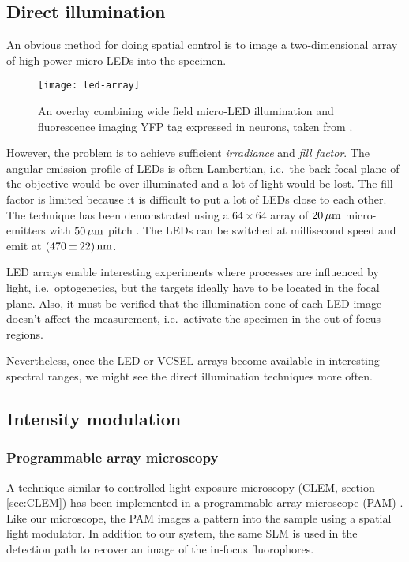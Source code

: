 \subsection{Direct illumination}
An obvious method for doing spatial control is to image a
two-dimensional array of high-power micro-LEDs into the specimen.
\begin{figure}[!hbt]
  \centering
  \texttt{[image: led-array]} 
  \caption{An overlay combining wide field micro-LED illumination and
    fluorescence imaging YFP tag expressed in neurons, taken from
    \citet{grossman2010}.}
  \label{fig:led-array}
\end{figure}
However, the problem is to achieve sufficient \emph{irradiance} and
\emph{fill factor}. The angular emission profile of LEDs is often
Lambertian, i.e.\ the back focal plane of the objective would be
over-illuminated and a lot of light would be lost. The fill factor is
limited because it is difficult to put a lot of LEDs close to each
other.  The technique has been demonstrated using a $64\times64$ array
of $\unit[20]{\mu m}$ micro-emitters with $\unit[50]{\mu m}$ pitch
\citep{grossman2010}.  The LEDs can be switched at millisecond speed
and emit at $\unit[(470\pm22)]{nm}$.


LED arrays enable interesting experiments where processes are
influenced by light, i.e.\ optogenetics, but the targets ideally have
to be located in the focal plane. Also, it must be verified that the
illumination cone of each LED image doesn't affect the measurement,
i.e.\ activate the specimen in the out-of-focus regions.

Nevertheless, once the LED or VCSEL arrays become available in
interesting spectral ranges, we might see the direct illumination
techniques more often.

\subsection{Intensity modulation}
\subsubsection{Programmable array microscopy}
A technique similar to controlled light exposure microscopy (CLEM,
section \ref{sec:CLEM}) has been implemented in a programmable array
microscope (PAM) \citep{Caarls2011}. Like our microscope, the PAM
images a pattern into the sample using a spatial light modulator. In
addition to our system, the same SLM is used in the detection path to
recover an image of the in-focus fluorophores.

